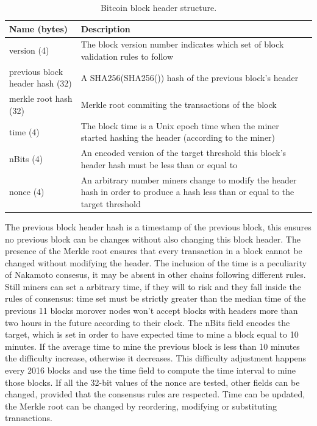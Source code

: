 \begin{table}
\begin{center}
\begin{tabular}{|p{5cm}|p{5cm}|}
	\hline
	\textbf{Name} (bytes) & \textbf{Description} \\ \hline
	version (4) & The block version number indicates which set of block validation rules to follow \\ \hline
	previous block header hash (32) & A SHA256(SHA256()) hash of the previous block’s header \\ \hline
	merkle root hash (32) & Merkle root commiting the transactions of the block \\ \hline
	time (4) & The block time is a Unix epoch time when the miner started hashing the header (according to the miner) \\ \hline
	nBits (4) & An encoded version of the target threshold this block’s header hash must be less than or equal to \\ \hline
	nonce (4) & An arbitrary number miners change to modify the header hash in order to produce a hash less than or equal to the target threshold \\ \hline
\end{tabular}
\end{center}
\caption[Bitcoin block header structure.]{Bitcoin block header structure.}
\label{tab:block-header}
\end{table}
The previous block header hash is a timestamp of the previous block, this ensures no previous block can be changes without also changing this block header.
The presence of the Merkle root ensures that every transaction in a block cannot be changed without modifying the header.
The inclusion of the time is a peculiarity of Nakamoto consesus, it may be absent in other chains following different rules. 
Still miners can set a arbitrary time, if they will to risk and they fall inside the rules of consensus: time set must be strictly greater than the median time of the previous 11 blocks morover nodes won't accept blocks with headers more than two hours in the future according to their clock. 
The nBits field encodes the target, which is set in order to have expected time to mine a block equal to 10 minutes. If the average time to mine the previous block is less than 10 minutes the difficulty increase, otherwise it decreases. This difficulty adjustment happens every 2016 blocks and use the time field to compute the time interval to mine those blocks.
If all the 32-bit values of the nonce are tested, other fields can be changed, provided that the consensus rules are respected. Time can be updated, the Merkle root can be changed by reordering, modifying or substituting transactions. 

